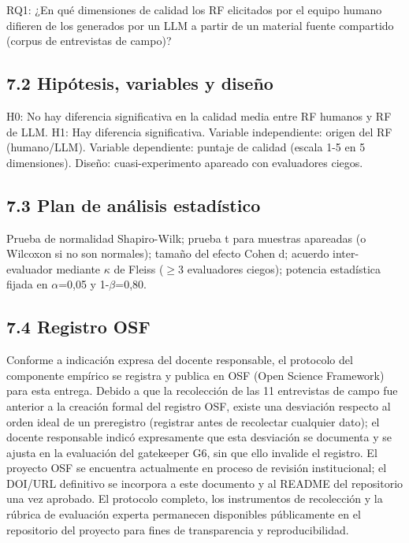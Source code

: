 RQ1: ¿En qué dimensiones de calidad los RF elicitados por el equipo humano difieren de los generados por un LLM a partir de un material fuente compartido (corpus de entrevistas de campo)?


\subsection*{7.2 Hipótesis, variables y diseño}


H0: No hay diferencia significativa en la calidad media entre RF humanos y RF de LLM. H1: Hay diferencia significativa. Variable independiente: origen del RF (humano/LLM). Variable dependiente: puntaje de calidad (escala 1-5 en 5 dimensiones). Diseño: cuasi-experimento apareado con evaluadores ciegos.


\subsection*{7.3 Plan de análisis estadístico}


Prueba de normalidad Shapiro-Wilk; prueba t para muestras apareadas (o Wilcoxon si no son normales); tamaño del efecto Cohen d; acuerdo inter-evaluador mediante $\kappa$ de Fleiss ($\geq$3 evaluadores ciegos); potencia estadística fijada en $\alpha$=0,05 y 1-$\beta$=0,80.


\subsection*{7.4 Registro OSF}


Conforme a indicación expresa del docente responsable, el protocolo del componente empírico se registra y publica en OSF (Open Science Framework) para esta entrega. Debido a que la recolección de las 11 entrevistas de campo fue anterior a la creación formal del registro OSF, existe una desviación respecto al orden ideal de un preregistro (registrar antes de recolectar cualquier dato); el docente responsable indicó expresamente que esta desviación se documenta y se ajusta en la evaluación del gatekeeper G6, sin que ello invalide el registro. El proyecto OSF se encuentra actualmente en proceso de revisión institucional; el DOI/URL definitivo se incorpora a este documento y al README del repositorio una vez aprobado. El protocolo completo, los instrumentos de recolección y la rúbrica de evaluación experta permanecen disponibles públicamente en el repositorio del proyecto para fines de transparencia y reproducibilidad.


